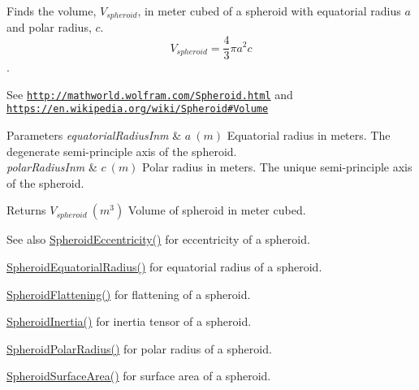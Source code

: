 Finds the volume, $V_{spheroid}$, in meter cubed of a spheroid with equatorial radius $a$ and polar radius, $c$. \[ V_{spheroid}=\frac{4}{3}\pi a^2 c \]. 

See \href{http://mathworld.wolfram.com/Spheroid.html}{\tt http\+://mathworld.\+wolfram.\+com/\+Spheroid.\+html} and \href{https://en.wikipedia.org/wiki/Spheroid#Volume}{\tt https\+://en.\+wikipedia.\+org/wiki/\+Spheroid\#\+Volume}


\begin{DoxyParams}{Parameters}
{\em equatorial\+Radius\+Inm} & $ a\ (m)$ Equatorial radius in meters. The degenerate semi-\/principle axis of the spheroid. \\
\hline
{\em polar\+Radius\+Inm} & $ c\ (m)$ Polar radius in meters. The unique semi-\/principle axis of the spheroid. \\
\hline
\end{DoxyParams}
\begin{DoxyReturn}{Returns}
$ V_{spheroid}\ (m^3)$ Volume of spheroid in meter cubed. 
\end{DoxyReturn}
\begin{DoxySeeAlso}{See also}
\mbox{\hyperlink{group___e_g_x_math-_geometry-3_d-_spheroid-_eccentricity_gab45680528a41bb7a5e15ddc0059156dd}{Spheroid\+Eccentricity()}} for eccentricity of a spheroid. 

\mbox{\hyperlink{group___e_g_x_math-_geometry-3_d-_spheroid-_equatorial_radius_ga1cbe564fee1b509c622d1c6d276158cd}{Spheroid\+Equatorial\+Radius()}} for equatorial radius of a spheroid. 

\mbox{\hyperlink{group___e_g_x_math-_geometry-3_d-_spheroid-_flattening_ga05e3be91f5f7fbaa9371687aa3834179}{Spheroid\+Flattening()}} for flattening of a spheroid. 

\mbox{\hyperlink{group___e_g_x_math-_geometry-3_d-_spheroid-_inertia_ga4a6085f1b3504bd682ee6818542ae09e}{Spheroid\+Inertia()}} for inertia tensor of a spheroid. 

\mbox{\hyperlink{group___e_g_x_math-_geometry-3_d-_spheroid-_polar_radius_gad4791a46a7efe39c63c03d2366fdd3d2}{Spheroid\+Polar\+Radius()}} for polar radius of a spheroid. 

\mbox{\hyperlink{group___e_g_x_math-_geometry-3_d-_spheroid-_surface_area_ga5a3580e7ded82cb678a558905f41ae49}{Spheroid\+Surface\+Area()}} for surface area of a spheroid. 
\end{DoxySeeAlso}
